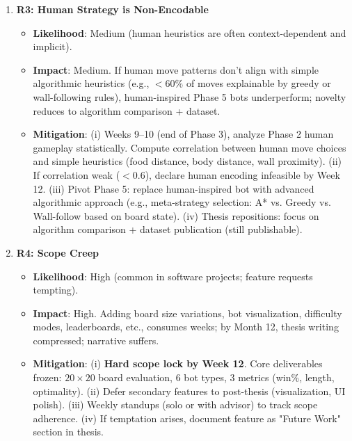 \documentclass[11pt,a4paper]{article}
\begin{document}
\begin{enumerate}
    \item \textbf{R3: Human Strategy is Non-Encodable}
    \begin{itemize}
        \item \textbf{Likelihood}: Medium (human heuristics are often context-dependent and implicit).
        \item \textbf{Impact}: Medium. If human move patterns don't align with simple algorithmic heuristics (e.g., $< 60\%$ of moves explainable by greedy or wall-following rules), human-inspired Phase 5 bots underperform; novelty reduces to algorithm comparison + dataset.
        \item \textbf{Mitigation}: (i) Weeks 9--10 (end of Phase 3), analyze Phase 2 human gameplay statistically. Compute correlation between human move choices and simple heuristics (food distance, body distance, wall proximity). (ii) If correlation weak ($< 0.6$), declare human encoding infeasible by Week 12. (iii) Pivot Phase 5: replace human-inspired bot with advanced algorithmic approach (e.g., meta-strategy selection: A* vs. Greedy vs. Wall-follow based on board state). (iv) Thesis repositions: focus on algorithm comparison + dataset publication (still publishable).
    \end{itemize}

    \item \textbf{R4: Scope Creep}
    \begin{itemize}
        \item \textbf{Likelihood}: High (common in software projects; feature requests tempting).
        \item \textbf{Impact}: High. Adding board size variations, bot visualization, difficulty modes, leaderboards, etc., consumes weeks; by Month 12, thesis writing compressed; narrative suffers.
        \item \textbf{Mitigation}: (i) \textbf{Hard scope lock by Week 12}. Core deliverables frozen: $20 \times 20$ board evaluation, 6 bot types, 3 metrics (win\%, length, optimality). (ii) Defer secondary features to post-thesis (visualization, UI polish). (iii) Weekly standups (solo or with advisor) to track scope adherence. (iv) If temptation arises, document feature as "Future Work" section in thesis.
    \end{itemize}


\end{enumerate}
\end{document}
